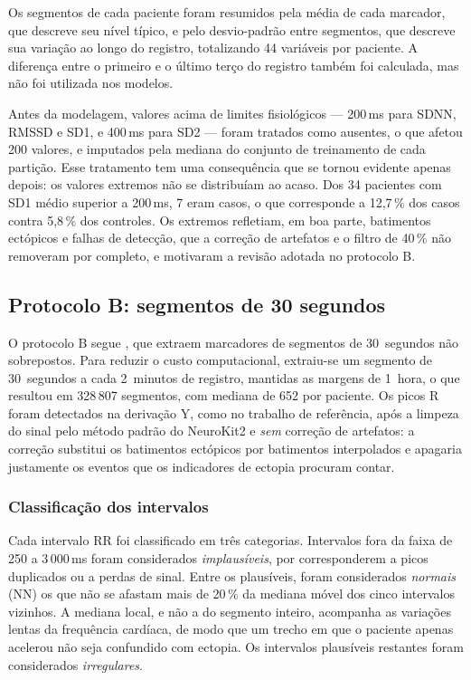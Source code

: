 Os segmentos de cada paciente foram resumidos pela média de cada marcador,
que descreve seu nível típico, e pelo desvio-padrão entre segmentos, que
descreve sua variação ao longo do registro, totalizando 44 variáveis por
paciente. A diferença entre o primeiro e o último terço do registro também
foi calculada, mas não foi utilizada nos modelos.

Antes da modelagem, valores acima de limites fisiológicos --- 200\,ms para
SDNN, RMSSD e SD1, e 400\,ms para SD2 --- foram tratados como ausentes, o que
afetou 200 valores, e imputados pela mediana do conjunto de treinamento de
cada partição. Esse tratamento tem uma consequência que se tornou evidente
apenas depois: os valores extremos não se distribuíam ao acaso. Dos 34
pacientes com SD1 médio superior a 200\,ms, 7 eram casos, o que corresponde
a 12,7\,\% dos casos contra 5,8\,\% dos controles. Os extremos refletiam,
em boa parte, batimentos ectópicos e falhas de detecção, que a correção de
artefatos e o filtro de 40\,\% não removeram por completo, e motivaram a
revisão adotada no protocolo B.

\subsection{Protocolo B: segmentos de 30 segundos}
\label{subsec:met-protocolo-b}

O protocolo B segue , que extraem marcadores de
segmentos de 30~segundos não sobrepostos. Para reduzir o custo
computacional, extraiu-se um segmento de 30~segundos a cada 2~minutos de
registro, mantidas as margens de 1~hora, o que resultou em 328\,807
segmentos, com mediana de 652 por paciente. Os picos R foram detectados na
derivação Y, como no trabalho de referência, após a limpeza do sinal pelo
método padrão do NeuroKit2 e \textit{sem} correção de artefatos: a correção
substitui os batimentos ectópicos por batimentos interpolados e apagaria
justamente os eventos que os indicadores de ectopia procuram contar.

\subsubsection{Classificação dos intervalos}

Cada intervalo RR foi classificado em três categorias. Intervalos fora da
faixa de 250 a 3\,000\,ms foram considerados \textit{implausíveis}, por
corresponderem a picos duplicados ou a perdas de sinal. Entre os plausíveis,
foram considerados \textit{normais} (NN) os que não se afastam mais de
20\,\% da mediana móvel dos cinco intervalos vizinhos. A mediana local, e
não a do segmento inteiro, acompanha as variações lentas da frequência
cardíaca, de modo que um trecho em que o paciente apenas acelerou não seja
confundido com ectopia. Os intervalos plausíveis restantes foram
considerados \textit{irregulares}.

